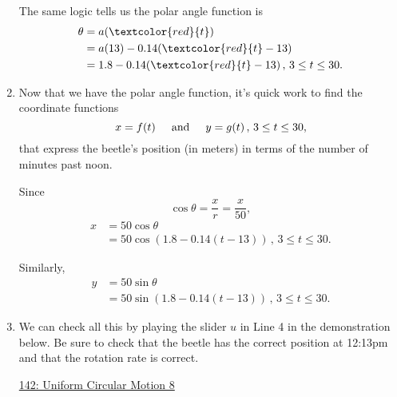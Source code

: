 \documentclass{ximera}
\begin{document}
\begin{question}
\begin{explanation}
\begin{enumerate}
The same logic tells us the polar angle function is
\begin{align*}
 \theta &= a(\textcolor{red}{t}) \\
           &=   a(13) - 0.14(\textcolor{red}{t} - 13)   \\
            &= 1.8  - 0.14(\textcolor{red}{t} - 13)   \, , \, 3\leq t \leq 30 .
\end{align*}

\item Now that we have the polar angle function, it's quick work to find the coordinate functions 
\[
       x = f(t) \hskip 0.2in  \text{and} \hskip 0.2in  y=g(t) \, , \, 3\leq t \leq 30 ,
\] 
that express the beetle's position (in meters) in terms of the number of minutes past noon.

Since 
\[
    \cos\theta = \frac{x}{r} = \frac{x}{50} ,
\]
\begin{align*}
    x        &= 50\cos\theta \\
       &= 50\cos \left( 1.8  - 0.14(t - 13) \right)  \, , \, 3\leq t \leq 30  .
\end{align*}

Similarly,
\begin{align*}
    y        &= 50\sin\theta \\
       &= 50\sin \left( 1.8  - 0.14(t - 13) \right)  \, , \, 3\leq t \leq 30  .
\end{align*}

\item We can check all this by playing the slider $u$ in Line 4 in the demonstration below. Be sure to check that the beetle has the correct position at 12:13pm and that the rotation rate is correct.

\begin{onlineOnly}
    \begin{center}
\end{center}
\end{onlineOnly}

\href{https://www.desmos.com/calculator/h0ojebdzqy}{142: Uniform Circular Motion 8}


\end{enumerate}
\end{explanation}


\end{question}
\end{document}
